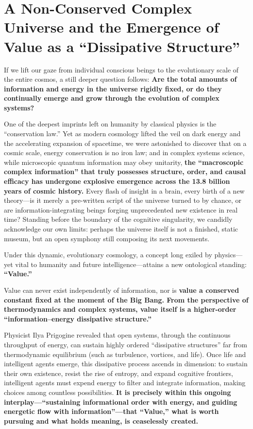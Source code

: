 \documentclass[11pt,a4paper]{article}
\begin{document}
\section{A Non-Conserved Complex Universe and the Emergence of Value as a ``Dissipative Structure''}

If we lift our gaze from individual conscious beings to the evolutionary scale of the entire cosmos, a still deeper question follows: \textbf{Are the total amounts of information and energy in the universe rigidly fixed, or do they continually emerge and grow through the evolution of complex systems?}

One of the deepest imprints left on humanity by classical physics is the ``conservation law.'' Yet as modern cosmology lifted the veil on dark energy and the accelerating expansion of spacetime, we were astonished to discover that on a cosmic scale, energy conservation is no iron law; and in complex systems science, while microscopic quantum information may obey unitarity, \textbf{the ``macroscopic complex information'' that truly possesses structure, order, and causal efficacy has undergone explosive emergence across the 13.8 billion years of cosmic history.} Every flash of insight in a brain, every birth of a new theory---is it merely a pre-written script of the universe turned to by chance, or are information-integrating beings forging unprecedented new existence in real time? Standing before the boundary of the cognitive singularity, we candidly acknowledge our own limits: perhaps the universe itself is not a finished, static museum, but an open symphony still composing its next movements.

Under this dynamic, evolutionary cosmology, a concept long exiled by physics---yet vital to humanity and future intelligence---attains a new ontological standing: \textbf{``Value.''}

Value can never exist independently of information, nor is \textbf{value a conserved constant fixed at the moment of the Big Bang. From the perspective of thermodynamics and complex systems, value itself is a higher-order ``information--energy dissipative structure.''}

Physicist Ilya Prigogine revealed that open systems, through the continuous throughput of energy, can sustain highly ordered ``dissipative structures'' far from thermodynamic equilibrium (such as turbulence, vortices, and life). Once life and intelligent agents emerge, this dissipative process ascends in dimension: to sustain their own existence, resist the rise of entropy, and expand cognitive frontiers, intelligent agents must expend energy to filter and integrate information, making choices among countless possibilities. \textbf{It is precisely within this ongoing interplay---``sustaining informational order with energy, and guiding energetic flow with information''---that ``Value,'' what is worth pursuing and what holds meaning, is ceaselessly created.}
\end{document}
